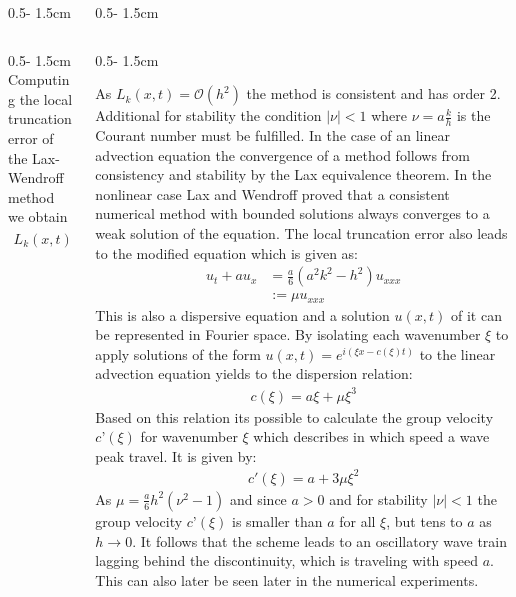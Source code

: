 \documentclass{uibposter}
\begin{document}
\begin{frame}[fragile]
\begin{columns}
\begin{column}{0.5\textwidth - 1.5cm}
\begin{column}{0.5\textwidth - 1.5cm}
\vspace{0.2cm}
Computing the local truncation error of the Lax-Wendroff method we obtain
\begin{align*}
L_k(x, t) = \frac{a}{6}(a^2 k^2 - h^2)u_{xxx} + \mathcal{O}(h^3)
\end{align*}

    \end{column}
\end{column}
\begin{column}{0.5\textwidth - 1.5cm}
\begin{column}{0.5\textwidth - 1.5cm}
\vspace*{-14.5cm}

As $L_k(x,t) = \mathcal{O}(h^2)$ the method is consistent and has order 2. Additional for stability the condition $|\nu| < 1$ where $\nu = a\frac{k}{h}$ is the Courant number must be fulfilled. 
In the case of an linear advection equation the convergence of a method follows from consistency and stability by the Lax equivalence theorem. In the nonlinear case Lax and Wendroff proved that a consistent numerical method with bounded solutions always converges to a weak solution of the equation.
The local truncation error also leads to the modified equation which is given as:
\begin{align*}
u_t + a u_x &= \frac{a}{6} (a^2 k^2 - h^2) u_{xxx}\\
&:= \mu u_{xxx}
\end{align*}
This is also a dispersive equation and a solution $u(x, t)$ of it can be represented in Fourier space. By isolating each wavenumber $\xi$ to apply solutions of the form $u(x,t) = e^{i(\xi x - c(\xi)t)}$ to the linear advection equation yields to the dispersion relation:
\begin{align*}
c(\xi) = a\xi + \mu \xi^3
\end{align*}
Based on this relation its possible to calculate the group velocity $c’(\xi)$ for wavenumber $\xi$ which describes in which speed a wave peak travel. It is given by:
\begin{align*}
c'(\xi) = a + 3\mu \xi^2
\end{align*}
As $\mu = \frac{a}{6}h^2(\nu^2 - 1)$ and since $a > 0$ and for stability $|\nu| < 1$ the group velocity $c’(\xi)$ is smaller than $a$ for all $\xi$, but tens to $a$ as $h\rightarrow0$. It follows that the scheme leads to an oscillatory wave train lagging behind the discontinuity, which is traveling with speed $a$. This can also later be seen later in the numerical experiments.
    

\end{column}
\end{column}
\end{columns}
\end{frame}
\end{document}
